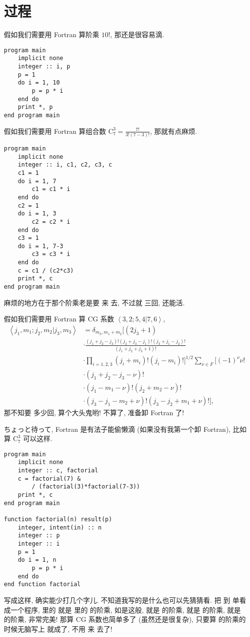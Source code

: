 \chapter{过程} \label{fortran_procedure} 

假如我们需要用 Fortran 算阶乘 $ 10! $, 那还是很容易滴. 
\begin{lstlisting} 
program main
    implicit none
    integer :: i, p
    p = 1
    do i = 1, 10
        p = p * i
    end do
    print *, p
end program main
\end{lstlisting} 

假如我们需要用 Fortran 算组合数 $ \text{C} _7^3=\frac{7!} {3!(7-3)!} $, 那就有点麻烦. 
\begin{lstlisting} 
program main
    implicit none
    integer :: i, c1, c2, c3, c
    c1 = 1
    do i = 1, 7
        c1 = c1 * i
    end do
    c2 = 1
    do i = 1, 3
        c2 = c2 * i
    end do
    c3 = 1
    do i = 1, 7-3
        c3 = c3 * i
    end do
    c = c1 / (c2*c3)
    print *, c
end program main
\end{lstlisting} 
麻烦的地方在于那个阶乘老是要  来  去, 不过就  三回, 还能活. 

假如我们需要用 Fortran 算 CG 系数 $ \left\langle 3, 2;5, 4|7, 6\right\rangle  $, 
\begin{align*} 
    \left\langle j_1, m_1;j_2, m_2|j_3, m_3\right\rangle&=\delta_{m_3, m_1+m_2} \Big[(2j_3+1)\\
    &\cdot\frac{(j_1+j_2-j_3)!(j_2+j_3-j_1)!(j_3+j_1-j_2)!} {(j_1+j_2+j_3+1)!} 
    \\
    &\cdot\prod_{i=1, 2, 3}(j_i+m_i)!(j_i-m_i)!\Big]^{1/2} \sum_{\nu\in F} [(-1)^{\nu} \nu!\\
    &\cdot(j_1+j_2-j_3-\nu)!\\
    &\cdot(j_1-m_1-\nu)!(j_2+m_2-\nu)!\\
    &\cdot(j_3-j_1-m_2+\nu)!(j_3-j_2+m_1+\nu)!], 
\end{align*} 
那不知要  多少回, 算个大头鬼哟! 不算了, 准备卸 Fortran 了!

ちょっと待って, Fortran 是有法子能偷懒滴 (如果没有我第一个卸 Fortran), 比如算 $ \text{C} _7^3 $ 可以这样. 
\begin{lstlisting} 
program main
    implicit none
    integer :: c, factorial
    c = factorial(7) &
        / (factorial(3)*factorial(7-3))
    print *, c
end program main

function factorial(n) result(p)
    integer, intent(in) :: n
    integer :: p
    integer :: i 
    p = 1
    do i = 1, n
        p = p * i
    end do
end function factorial
\end{lstlisting} 
写成这样, 确实能少打几个字儿. 不知道我写的是什么也可以先猜猜看. 把  到  单看成一个程序,  里的  就是  里的  的阶乘, 如是这般,  就是  的阶乘,  就是  的阶乘,  就是  的阶乘, 非常完美! 那算 CG 系数也简单多了 (虽然还是很复杂), 只要算  的阶乘的时候无脑写上  就成了, 不用  来  去了!

